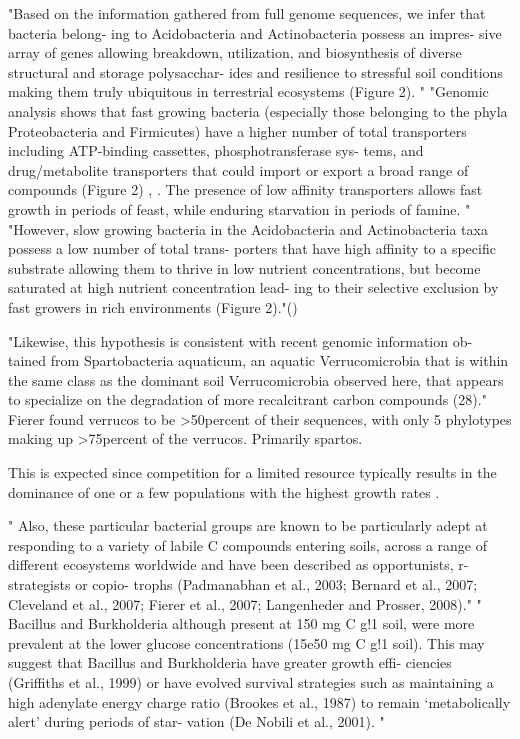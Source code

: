"Based on the information gathered from full genome sequences, we infer that bacteria belong- ing to Acidobacteria and Actinobacteria possess an impres- sive array of genes allowing breakdown, utilization, and biosynthesis of diverse structural and storage polysacchar- ides and resilience to stressful soil conditions making them truly ubiquitous in terrestrial ecosystems (Figure 2). \cite{Trivedi_2013}" "Genomic analysis shows that fast growing bacteria (especially those belonging to the phyla Proteobacteria and Firmicutes) have a higher number of total transporters including ATP-binding cassettes, phosphotransferase sys- tems, and drug/metabolite transporters that could import or export a broad range of compounds (Figure 2) \cite{Barabote_2005}, \cite{Trivedi_2013}. The presence of low affinity transporters allows fast growth in periods of feast, while enduring starvation in periods of famine. "
"However, slow growing bacteria in the Acidobacteria and Actinobacteria taxa possess a low number of total trans- porters that have high affinity to a specific substrate allowing them to thrive in low nutrient concentrations, but become saturated at high nutrient concentration lead- ing to their selective exclusion by fast growers in rich environments (Figure 2)."(\cite{Trivedi_2013})

"Likewise, this hypothesis is consistent with recent genomic information ob- tained from Spartobacteria aquaticum, an aquatic Verrucomicrobia that is within the same class as the dominant soil Verrucomicrobia observed here, that appears to specialize on the degradation of more recalcitrant carbon compounds (28)."  Fierer found verrucos to be >50percent of their sequences, with only 5 phylotypes making up >75percent of the verrucos.  Primarily spartos.  \cite{Fierer_2013} 

This is expected since competition for a limited resource typically results in the dominance of one or a few populations with the highest growth rates \cite{Fontaine_2003}.

"  Also, these particular bacterial groups are known to be particularly adept at responding to a variety of labile C compounds entering soils, across a range of different ecosystems worldwide and have been described as opportunists, r-strategists or copio- trophs (Padmanabhan et al., 2003; Bernard et al., 2007; Cleveland et al., 2007; Fierer et al., 2007; Langenheder and Prosser, 2008)." " Bacillus and Burkholderia although present at 150 mg C g!1 soil, were more prevalent at the lower glucose concentrations (15e50 mg C g!1 soil). This may suggest that Bacillus and Burkholderia have greater growth effi- ciencies (Griffiths et al., 1999) or have evolved survival strategies such as maintaining a high adenylate energy charge ratio (Brookes et al., 1987) to remain ‘metabolically alert’ during periods of star- vation (De Nobili et al., 2001). "\cite{Jenkins_2010}

